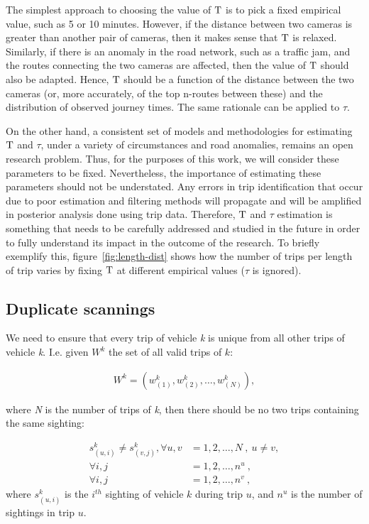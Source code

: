 The simplest approach to choosing the value of $\mathrm{T}$ is to pick a fixed empirical value, such as 5 or 10 minutes. However, if the distance between two cameras is greater than another pair of cameras, then it makes sense that $\mathrm{T}$ is relaxed. Similarly, if there is an anomaly in the road network, such as a traffic jam, and the routes connecting the two cameras are affected, then the value of $\mathrm{T}$ should also be adapted. Hence, $\mathrm{T}$ should be a function of the distance between the two cameras (or, more accurately, of the top n-routes between these) and the distribution of observed journey times. The same rationale can be applied to $\tau$.

On the other hand, a consistent set of models and methodologies for estimating $\mathrm{T}$ and $\tau$, under a variety of circumstances and road anomalies, remains an open research problem. Thus, for the purposes of this work, we will consider these parameters to be fixed. Nevertheless, the importance of estimating these parameters should not be understated. Any errors in trip identification that occur due to poor estimation and filtering methods will propagate and will be amplified in posterior analysis done using trip data. Therefore, $\mathrm{T}$ and $\tau$ estimation is something that needs to be carefully addressed and studied in the future in order to fully understand its impact in the outcome of the research. To briefly exemplify this, figure~\ref{fig:length-dist} shows how the number of trips per length of trip varies by fixing $\mathrm{T}$ at different empirical values ($\tau$ is ignored).

\subsection{Duplicate scannings}

We need to ensure that every trip of vehicle \emph{k} is unique from all other trips of vehicle \emph{k}. I.e. given $W^k$ the set of all valid trips of $k$:

\begin{align}
W^{k} = \left( w^{k}_{(1)}, w^{k}_{(2)}, \ldots, w^{k}_{(N)} \right) \label{e.trip.history},
\end{align}

where \emph{N} is the number of trips of \emph{k}, then there should be no two trips containing the same sighting:

\begin{align}
s^{k}_{(u,i)} \neq s^{k}_{(v,j)}, \forall u,v &= 1, 2, \ldots, N \ , \ u \neq v,  \label{e.trip.history.constraint} \\
\forall i,j &= 1, 2, \ldots, n^u \ ,\nonumber \\
\forall i,j &= 1, 2, \ldots, n^v \ , \nonumber
\end{align}
where $s_{(u,i)}^k$ is the $i^{th}$ sighting of vehicle $k$ during trip $u$, and $n^u$ is the number of sightings in trip $u$.

